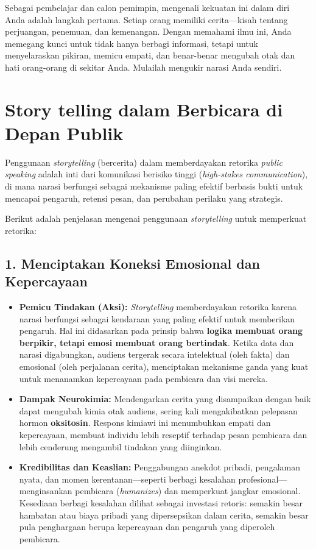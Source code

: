\documentclass[
  letterpaper,
  DIV=11,
  numbers=noendperiod]{scrreprt}
\providecommand{\tightlist}{%
  \setlength{\itemsep}{0pt}\setlength{\parskip}{0pt}}
\begin{document}
Sebagai pembelajar dan calon pemimpin, mengenali kekuatan ini dalam diri
Anda adalah langkah pertama. Setiap orang memiliki cerita---kisah
tentang perjuangan, penemuan, dan kemenangan. Dengan memahami ilmu ini,
Anda memegang kunci untuk tidak hanya berbagi informasi, tetapi untuk
menyelaraskan pikiran, memicu empati, dan benar-benar mengubah otak dan
hati orang-orang di sekitar Anda. Mulailah mengukir narasi Anda sendiri.

\section{Story telling dalam Berbicara di Depan
Publik}\label{story-telling-dalam-berbicara-di-depan-publik}

Penggunaan \emph{storytelling} (bercerita) dalam memberdayakan retorika
\emph{public speaking} adalah inti dari komunikasi berisiko tinggi
(\emph{high-stakes communication}), di mana narasi berfungsi sebagai
mekanisme paling efektif berbasis bukti untuk mencapai pengaruh, retensi
pesan, dan perubahan perilaku yang strategis.

Berikut adalah penjelasan mengenai penggunaan \emph{storytelling} untuk
memperkuat retorika:

\subsection{1. Menciptakan Koneksi Emosional dan
Kepercayaan}\label{menciptakan-koneksi-emosional-dan-kepercayaan}

\begin{itemize}
\tightlist
\item
  \textbf{Pemicu Tindakan (Aksi):} \emph{Storytelling} memberdayakan
  retorika karena narasi berfungsi sebagai kendaraan yang paling efektif
  untuk memberikan pengaruh. Hal ini didasarkan pada prinsip bahwa
  \textbf{logika membuat orang berpikir, tetapi emosi membuat orang
  bertindak}. Ketika data dan narasi digabungkan, audiens tergerak
  secara intelektual (oleh fakta) dan emosional (oleh perjalanan
  cerita), menciptakan mekanisme ganda yang kuat untuk menanamkan
  kepercayaan pada pembicara dan visi mereka.
\item
  \textbf{Dampak Neurokimia:} Mendengarkan cerita yang disampaikan
  dengan baik dapat mengubah kimia otak audiens, sering kali
  mengakibatkan pelepasan hormon \textbf{oksitosin}. Respons kimiawi ini
  menumbuhkan empati dan kepercayaan, membuat individu lebih reseptif
  terhadap pesan pembicara dan lebih cenderung mengambil tindakan yang
  diinginkan.
\item
  \textbf{Kredibilitas dan Keaslian:} Penggabungan anekdot pribadi,
  pengalaman nyata, dan momen kerentanan---seperti berbagi kesalahan
  profesional---menginsankan pembicara (\emph{humanizes}) dan memperkuat
  jangkar emosional. Kesediaan berbagi kesalahan dilihat sebagai
  investasi retoris: semakin besar hambatan atau biaya pribadi yang
  dipersepsikan dalam cerita, semakin besar pula penghargaan berupa
  kepercayaan dan pengaruh yang diperoleh pembicara.
\end{itemize}
\end{document}
